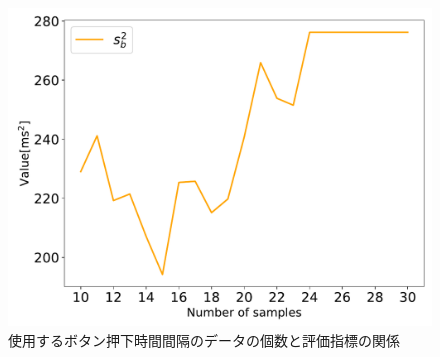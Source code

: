 \begin{figure}[bt]
  \centering
  \includegraphics[scale=0.6]{figures/Yobi/Var/NumberOfSamples_varSb.pdf}
  \caption{使用するボタン押下時間間隔のデータの個数と評価指標の関係}
  \label{fig:Numberofsamples_Sb}
\end{figure}

